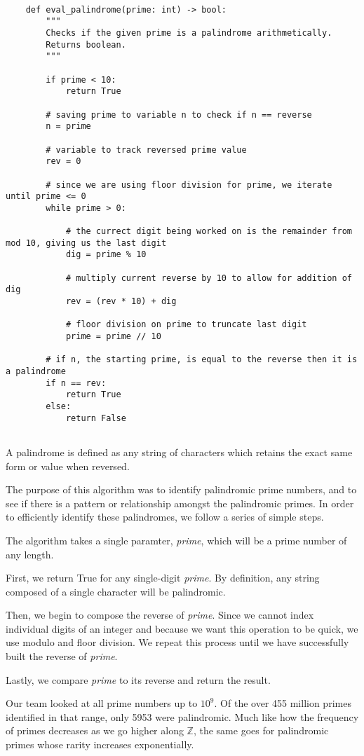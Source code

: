 \documentclass[11pt]{article}
\begin{document}
	
\lstset{style = Palindromes}

\begin{lstlisting}
	
	def eval_palindrome(prime: int) -> bool:
		"""
		Checks if the given prime is a palindrome arithmetically.
		Returns boolean.
		"""
		
		if prime < 10:
			return True
		
		# saving prime to variable n to check if n == reverse
		n = prime
		
		# variable to track reversed prime value
		rev = 0
		
		# since we are using floor division for prime, we iterate until prime <= 0
		while prime > 0:
			
			# the currect digit being worked on is the remainder from mod 10, giving us the last digit
			dig = prime % 10
			
			# multiply current reverse by 10 to allow for addition of dig
			rev = (rev * 10) + dig
			
			# floor division on prime to truncate last digit
			prime = prime // 10
		
		# if n, the starting prime, is equal to the reverse then it is a palindrome
		if n == rev:
			return True
		else:
			return False
		
\end{lstlisting}


A palindrome is defined as any string of characters which retains the exact same form or value when reversed.

The purpose of this algorithm was to identify palindromic prime numbers, and to see if there is a pattern or relationship amongst the palindromic primes. In order to efficiently identify these palindromes, we follow a series of simple steps.

The algorithm takes a single paramter, \textit{prime}, which will be a prime number of any length.

First, we return True for any single-digit \textit{prime}. By definition, any string composed of a single character will be palindromic.

Then, we begin to compose the reverse of \textit{prime}. Since we cannot index individual digits of an integer and because we want this operation to be quick, we use modulo and floor division. We repeat this process until we have successfully built the reverse of \textit{prime}.

Lastly, we compare \textit{prime }to its reverse and return the result.

Our team looked at all prime numbers up to $10^9$. Of the over 455 million primes identified in that range, only 5953 were palindromic. Much like how the frequency of primes decreases as we go higher along $\mathbb{Z}$, the same goes for palindromic primes whose rarity increases exponentially.
\end{document}
